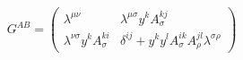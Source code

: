 \begin{equation}
G^{AB} = \begin{pmatrix} \lambda^{\mu\nu} & \lambda^{\mu\sigma}y^kA^{kj}_{\sigma} \\ \lambda^{\nu\sigma}y^kA^{ki}_{\sigma} & \delta^{ij} + y^ky^lA^{ik}_{\sigma}A^{jl}_{\rho}\lambda^{\sigma\rho} \end{pmatrix}
\label{2.6}
\end{equation}

